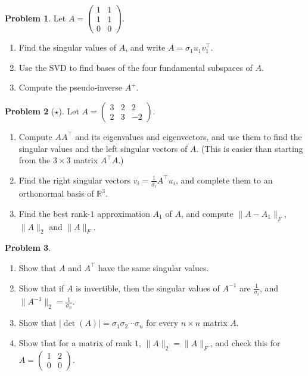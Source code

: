 \documentclass[11pt]{article}
\theoremstyle{definition}
\newtheorem{problem}{Problem}[section]
\newcommand{\norm}[1]{\lVert #1 \rVert}
\begin{document}
\begin{problem}\label{pr:svd-rank1}
    Let $A = \begin{pmatrix} 1 & 1 \\ 1 & 1 \\ 0 & 0 \end{pmatrix}$.
    \begin{enumerate}[label=(\alph*)]
        \item Find the singular values of $A$, and write $A = \sigma_1 u_1 v_1^\top$.
        \item Use the SVD to find bases of the four fundamental subspaces of $A$.
        \item Compute the pseudo-inverse $A^+$.
    \end{enumerate}
\end{problem}

\begin{problem}[$\star$]\label{pr:svd-2x3}
    Let $A = \begin{pmatrix} 3 & 2 & 2 \\ 2 & 3 & -2 \end{pmatrix}$.
    \begin{enumerate}[label=(\alph*)]
        \item Compute $AA^\top$ and its eigenvalues and eigenvectors, and use them to find the singular values and the left singular vectors of $A$. (This is easier than starting from the $3 \times 3$ matrix $A^\top A$.)
        \item Find the right singular vectors $v_i = \frac{1}{\sigma_i} A^\top u_i$, and complete them to an orthonormal basis of $\mathbb{R}^3$.
        \item Find the best rank-$1$ approximation $A_1$ of $A$, and compute $\norm{A - A_1}_F$, $\norm{A}_2$ and $\norm{A}_F$.
    \end{enumerate}
\end{problem}

\begin{problem}\label{pr:svd-props}
    \begin{enumerate}[label=(\alph*)]
        \item Show that $A$ and $A^\top$ have the same singular values.
        \item Show that if $A$ is invertible, then the singular values of $A^{-1}$ are $\frac{1}{\sigma_i}$, and $\norm{A^{-1}}_2 = \frac{1}{\sigma_n}$.
        \item Show that $|\det(A)| = \sigma_1 \sigma_2 \cdots \sigma_n$ for every $n \times n$ matrix $A$.
        \item Show that for a matrix of rank $1$, $\norm{A}_2 = \norm{A}_F$, and check this for $A = \begin{pmatrix} 1 & 2 \\ 0 & 0 \end{pmatrix}$.
    \end{enumerate}
\end{problem}
\end{document}
